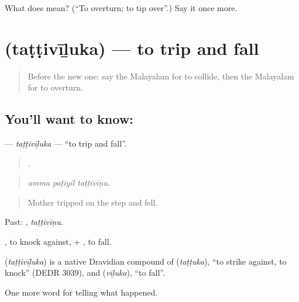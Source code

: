 \begin{tcolorbox}[breakable,colback=teal!4,colframe=teal!35!black,title={Before you move on}]
What does  mean? (\textquotedblleft{}To overturn; to tip over\textquotedblright{}.) Say it once more.
\end{tcolorbox}
\section[\texorpdfstring{\ml{തട്ടിവീഴുക} (taṭṭivīḻuka)}{തട്ടിവീഴുക (taṭṭivīḻuka)}]{ (taṭṭivīḻuka) — to trip and fall}

\label{lesson:ML-C379-tattiviluka}



\begin{quote}
Before the new one: say the Malayalam for to collide, then the Malayalam for to overturn.
\end{quote}

\subsection*{You'll want to know: }
\textbf{} — \emph{taṭṭivīḻuka} — \textquotedblleft{}to trip and fall\textquotedblright{}.

\begin{quote}
  .
\end{quote}

\begin{quote}
\emph{amma paṭiyil taṭṭivīṇu.}
\end{quote}

\begin{quote}
Mother tripped on the step and fell.
\end{quote}

Past: , \emph{taṭṭivīṇu}.

, to knock against, + , to fall.

\begin{cousinweb}
\textbf{} (\emph{taṭṭivīḻuka}) is a native Dravidian compound of  (\emph{taṭṭuka}), \textquotedblleft{}to strike against, to knock\textquotedblright{} (DEDR 3039), and  (\emph{vīḻuka}), \textquotedblleft{}to fall\textquotedblright{}.
\end{cousinweb}

\begin{grammarlens}[title={What you've built}]
One more word for telling what happened.
\end{grammarlens}

